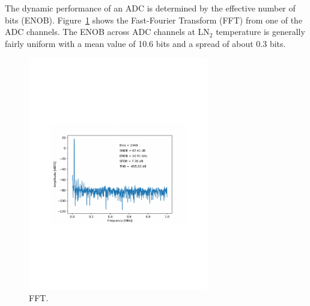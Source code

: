 \label{sec:4.3}


The dynamic performance of an ADC is determined by the effective number of bits (ENOB). Figure~\ref{fig:coldadc_fft} shows the Fast-Fourier Transform (FFT) from one of the ADC channels.  The ENOB across ADC channels at LN$_2$ temperature is generally fairly uniform with a mean value of 10.6 bits and a spread of about 0.3 bits. 
\begin{figure}[htb]
\centering
\begin{center}
\includegraphics[width=0.7\textwidth]{figures/fft_Sinusoid_20KHz_SE-SHA-ADC0_NomVREFPN_2M_v1.pdf}
\end{center}
\caption{FFT.}
\label{fig:coldadc_fft}
\end{figure}



